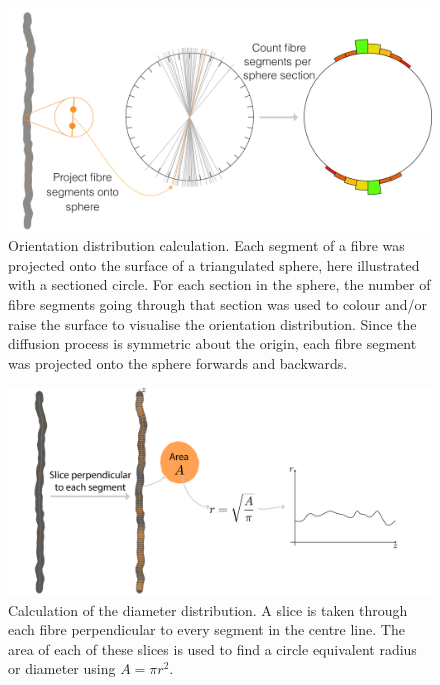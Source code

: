\begin{figure}
  \centering
  \includegraphics[width=\textwidth]{figures/config/od_calculation-01_sym_whitebg.png}
  \caption[Orientation distribution extraction from microstructure]{Orientation distribution calculation. Each segment of a fibre was projected onto the surface of a triangulated sphere, here illustrated with a sectioned circle. For each section in the sphere, the number of fibre segments going through that section was used to colour and/or raise the surface to visualise the orientation distribution. Since the diffusion process is symmetric about the origin, each fibre segment was projected onto the sphere forwards and backwards.}
  \label{fig:config_micro_OD}
\end{figure}

\begin{figure}
  \centering
  \includegraphics[width=\textwidth]{figures/config/diam_calculation-01.png}
  \caption[Diameter distribution extraction from microstructure]{Calculation of the diameter distribution. A slice is taken through each fibre perpendicular to every segment in the centre line. The area of each of these slices is used to find a circle equivalent radius or diameter using $A = \pi r^2$. }
  \label{fig:config_micro_diam}
\end{figure}


